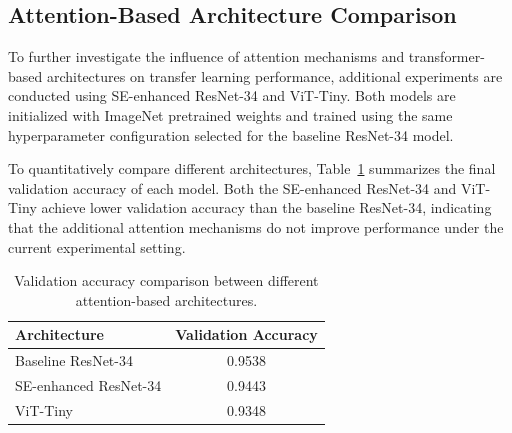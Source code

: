 \subsection{Attention-Based Architecture Comparison}

To further investigate the influence of attention mechanisms and transformer-based architectures on transfer learning performance, additional experiments are conducted using SE-enhanced ResNet-34 and ViT-Tiny. Both models are initialized with ImageNet pretrained weights and trained using the same hyperparameter configuration selected for the baseline ResNet-34 model.

To quantitatively compare different architectures, Table~\ref{tab:attention_comparison} summarizes the final validation accuracy of each model. Both the SE-enhanced ResNet-34 and ViT-Tiny achieve lower validation accuracy than the baseline ResNet-34, indicating that the additional attention mechanisms do not improve performance under the current experimental setting.

\begin{table}[H]
\centering
\caption{Validation accuracy comparison between different attention-based architectures.}
\label{tab:attention_comparison}
\begin{tabular}{l c}
\toprule
Architecture & Validation Accuracy \\
\midrule
Baseline ResNet-34 & 0.9538 \\
SE-enhanced ResNet-34 & 0.9443 \\
ViT-Tiny & 0.9348 \\
\bottomrule
\end{tabular}
\end{table}

